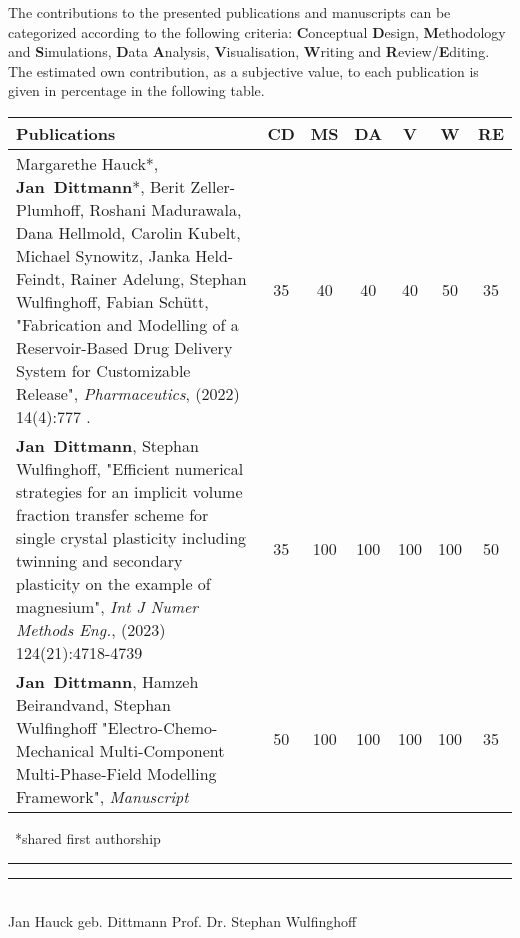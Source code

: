 The contributions to the presented publications and manuscripts can be categorized according to the following criteria: \textbf{C}onceptual \textbf{D}esign, \textbf{M}ethodology and \textbf{S}imulations, \textbf{D}ata \textbf{A}nalysis, \textbf{V}isualisation, \textbf{W}riting and \textbf{R}eview/\textbf{E}diting. The estimated own contribution, as a subjective value, to each publication is given in percentage in the following table.


	\begin{xltabular}{\textwidth}{| L | c | c | c | c | c | c |}
	\hline    
		\textbf{Publications} & \textbf{CD} & \textbf{MS} & \textbf{DA} & \textbf{V} & \textbf{W} & \textbf{RE}\tabularnewline 
		\hline    
Margarethe Hauck*, \mbox{\textbf{Jan Dittmann}*}, Berit Zeller-Plumhoff, Roshani Madurawala, Dana Hellmold,  Carolin Kubelt, Michael Synowitz, Janka Held-Feindt, Rainer Adelung, Stephan Wulfinghoff, Fabian Schütt, "Fabrication and Modelling of a Reservoir-Based Drug Delivery System for Customizable Release", \textit{Pharmaceutics}, (2022) 14(4):777 .&35&40&40&40&50&35\tabularnewline \hline
\mbox{\textbf{Jan Dittmann}}, Stephan Wulfinghoff, "Efficient numerical strategies for an implicit volume fraction transfer scheme for single crystal plasticity including twinning and secondary plasticity on the example of magnesium", \textit{Int J Numer Methods Eng.}, (2023) 124(21):4718-4739 & 35 & 100 & 100 & 100 & 100 & 50 \\ \hline
\mbox{\textbf{Jan Dittmann}}, Hamzeh Beirandvand, Stephan Wulfinghoff "Electro-Chemo-Mechanical Multi-Component Multi-Phase-Field Modelling Framework", \textit{Manuscript} & 50 & 100 & 100 & 100 & 100 & 35 \\ \hline
\end{xltabular} 
\vspace{-0.3cm}
{\small \ *shared first authorship} \vspace{4cm} \\
\rule{5cm}{0.2pt} \hspace{4cm} \rule{5cm}{0.2pt}\\ 
\hspace*{0cm} Jan Hauck geb. Dittmann \hspace{3.9cm} Prof. Dr. Stephan Wulfinghoff

